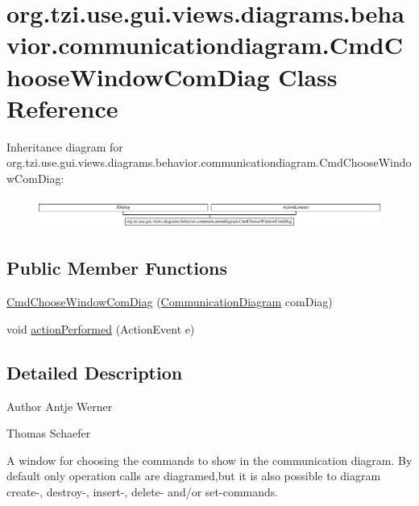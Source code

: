 \hypertarget{classorg_1_1tzi_1_1use_1_1gui_1_1views_1_1diagrams_1_1behavior_1_1communicationdiagram_1_1_cmd_choose_window_com_diag}{\section{org.\-tzi.\-use.\-gui.\-views.\-diagrams.\-behavior.\-communicationdiagram.\-Cmd\-Choose\-Window\-Com\-Diag Class Reference}
\label{classorg_1_1tzi_1_1use_1_1gui_1_1views_1_1diagrams_1_1behavior_1_1communicationdiagram_1_1_cmd_choose_window_com_diag}
}
Inheritance diagram for org.\-tzi.\-use.\-gui.\-views.\-diagrams.\-behavior.\-communicationdiagram.\-Cmd\-Choose\-Window\-Com\-Diag\-:\begin{figure}[H]
\begin{center}
\leavevmode
\includegraphics[height=1.029412cm]{classorg_1_1tzi_1_1use_1_1gui_1_1views_1_1diagrams_1_1behavior_1_1communicationdiagram_1_1_cmd_choose_window_com_diag}
\end{center}
\end{figure}
\subsection*{Public Member Functions}
\begin{DoxyCompactItemize}
\item 
\hyperlink{classorg_1_1tzi_1_1use_1_1gui_1_1views_1_1diagrams_1_1behavior_1_1communicationdiagram_1_1_cmd_choose_window_com_diag_a1527c5f6fbfd970015bbbb5c55ac002d}{Cmd\-Choose\-Window\-Com\-Diag} (\hyperlink{classorg_1_1tzi_1_1use_1_1gui_1_1views_1_1diagrams_1_1behavior_1_1communicationdiagram_1_1_communication_diagram}{Communication\-Diagram} com\-Diag)
\item 
void \hyperlink{classorg_1_1tzi_1_1use_1_1gui_1_1views_1_1diagrams_1_1behavior_1_1communicationdiagram_1_1_cmd_choose_window_com_diag_afbf579165a69dc2729f68e0e0c9b7617}{action\-Performed} (Action\-Event e)
\end{DoxyCompactItemize}


\subsection{Detailed Description}
\begin{DoxyAuthor}{Author}
Antje Werner 

Thomas Schaefer \begin{DoxyVerb}    A window for choosing the commands to show in the communication diagram.
    By default only operation calls are diagramed,but it is also possible
    to diagram create-, destroy-, insert-, delete- and/or set-commands.\end{DoxyVerb}
 
\end{DoxyAuthor}


